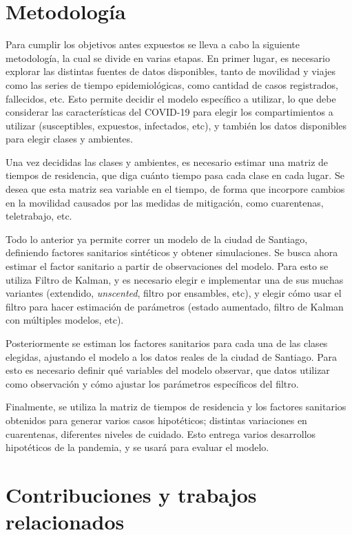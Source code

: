 \begin{intro}
 

\section*{Metodología}

Para cumplir los objetivos antes expuestos se lleva a cabo la siguiente metodología, la cual se divide en varias etapas. En primer lugar, es necesario explorar las distintas fuentes de datos disponibles, tanto de movilidad y viajes como las series de tiempo epidemiológicas, como cantidad de casos registrados, fallecidos, etc. Esto permite decidir el modelo específico a utilizar, lo que debe considerar las características del COVID-19 para elegir los compartimientos a utilizar (susceptibles, expuestos, infectados, etc), y también los datos disponibles para elegir clases y ambientes.

Una vez decididas las clases y ambientes, es necesario estimar una matriz de tiempos de residencia, que diga cuánto tiempo pasa cada clase en cada lugar. Se desea que esta matriz sea variable en el tiempo, de forma que incorpore cambios en la movilidad causados por las medidas de mitigación, como cuarentenas, teletrabajo, etc.

Todo lo anterior ya permite correr un modelo de la ciudad de Santiago, definiendo factores sanitarios sintéticos y obtener simulaciones. Se busca ahora estimar el factor sanitario a partir de observaciones del modelo. Para esto se utiliza Filtro de Kalman, y es necesario elegir e implementar una de sus muchas variantes (extendido, \textit{unscented}, filtro por ensambles, etc), y elegir cómo usar el filtro para hacer estimación de parámetros (estado aumentado, filtro de Kalman con múltiples modelos, etc).

Posteriormente se estiman los factores sanitarios para cada una de las clases elegidas, ajustando el modelo a los datos reales de la ciudad de Santiago. Para esto es necesario definir qué variables del modelo observar, que datos utilizar como observación y cómo ajustar los parámetros específicos del filtro.

Finalmente, se utiliza la matriz de tiempos de residencia y los factores sanitarios obtenidos para generar varios casos hipotéticos; distintas variaciones en cuarentenas, diferentes niveles de cuidado. Esto entrega varios desarrollos hipotéticos de la pandemia, y se usará para evaluar el modelo.


\section*{Contribuciones y trabajos relacionados}


\end{intro}
